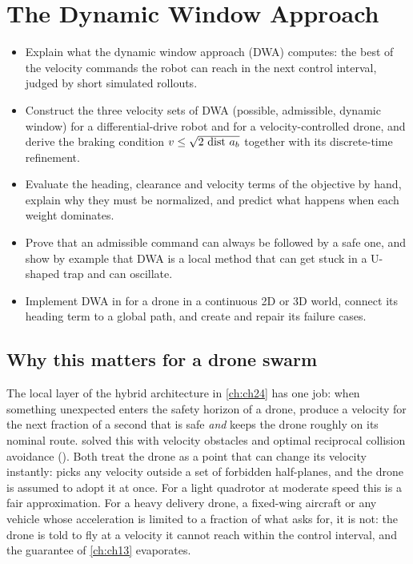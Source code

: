 \chapter{The Dynamic Window Approach}
\label{ch:ch14}

\begin{objectives}
\begin{itemize}
  \item Explain what the dynamic window approach (DWA) computes: the best of the
        velocity commands the robot can reach in the next control interval,
        judged by short simulated rollouts.
  \item Construct the three velocity sets of DWA (possible, admissible, dynamic window) for a differential-drive robot and for a velocity-controlled drone, and derive the braking condition $v \le \sqrt{2\,\operatorname{dist}\,a_b}$ together with its discrete-time refinement.
  \item Evaluate the heading, clearance and velocity terms of the objective by hand, explain why they must be normalized, and predict what happens when each weight dominates.
  \item Prove that an admissible command can always be followed by a safe one, and show by example that DWA is a local method that can get stuck in a U-shaped trap and can oscillate.
  \item Implement DWA in \python for a drone in a continuous 2D or 3D world, connect its heading term to a global path, and create and repair its failure cases.
\end{itemize}
\end{objectives}

\section{Why this matters for a drone swarm}
\label{sec:ch14-motivation}

The local layer of the hybrid architecture in \cref{ch:ch24} has one job: when
something unexpected enters the safety horizon of a drone, produce a velocity
for the next fraction of a second that is safe \emph{and} keeps the drone
roughly on its nominal route.  solved this with velocity
obstacles and optimal reciprocal collision avoidance (\orca). Both treat the drone as a point that can change its
velocity instantly: \orca picks any velocity outside a set of forbidden
half-planes, and the drone is assumed to adopt it at once. For a light
quadrotor at moderate speed this is a fair approximation. For a heavy
delivery drone, a fixed-wing aircraft or any vehicle whose acceleration is
limited to a fraction of what \orca asks for, it is not: the drone is told to
fly at a velocity it cannot reach within the control interval, and the
guarantee of \cref{ch:ch13} evaporates.

